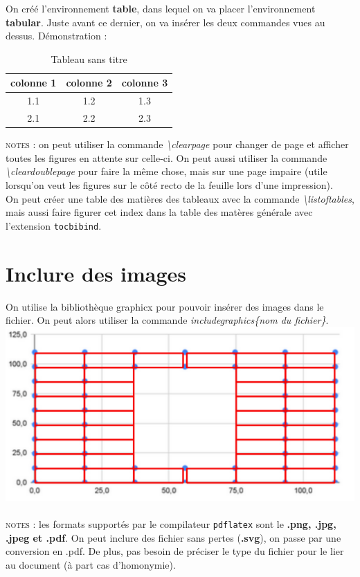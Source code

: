 \documentclass[a4paper, 10pt]{book}
\begin{document}
\pagebreak

On créé l'environnement \textbf{table}, dans lequel on va placer l'environnement \textbf{tabular}. Juste avant ce dernier, on va insérer les deux commandes vues au dessus. Démonstration :

\begin{table}[h]
\caption{\label{} Tableau sans titre}
\centering 
\begin{tabular}{|c|c|c|}
\\ 
\hline colonne 1 & colonne 2 & colonne 3 \\
\hline 1.1 & 1.2 & 1.3 \\
\hline 2.1 & 2.2 & 2.3 \\
\hline
\end{tabular}
\end{table}

\textsc{notes :} on peut utiliser la commande \textit{\textbackslash clearpage} pour changer de page et afficher toutes les figures en attente sur celle-ci. On peut aussi utiliser la commande \textit{\textbackslash cleardoublepage} pour faire la même chose, mais sur une page impaire (utile lorsqu'on veut les figures sur le côté recto de la feuille lors d'une impression). \\
On peut créer une table des matières des tableaux avec la commande \textit{\textbackslash listoftables}, mais aussi faire figurer cet index dans la table des matères générale avec l'extension \texttt{tocbibind}.

\listoftables

\chapter{Inclure des images}
On utilise la bibliothèque \textsf{graphicx} pour pouvoir insérer des images dans le fichier. On peut alors utiliser la commande \textit{includegraphics\{nom du fichier\}}.\\
\includegraphics{grapheHV}\\ \\
\textsc{notes :} les formats supportés par le compilateur \texttt{pdflatex} sont le \textbf{.png, .jpg, .jpeg et .pdf}. On peut inclure des fichier sans pertes (\textbf{.svg}), on passe par une conversion en .pdf. De plus, pas besoin de préciser le type du fichier pour le lier au document (à part cas d'homonymie).
\end{document}
